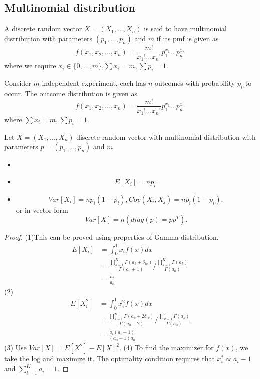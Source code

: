 \begin{refsection}
\subsection{Multinomial distribution}
\begin{definition}\cite[35]{murphy2012machine}
A discrete random vector $X=(X_1,...,X_n)$ is said to have multinomial distribution with parameters $(p_1,...,p_n)$ and $m$ if its pmf is given as
$$f(x_1,x_2,...,x_n)=\frac{m!}{x_1!...x_n!}p_1^{x_1}...p_n^{x_n}$$
where we require $x_i\in \{0,...,m\}$,$\sum x_i = m,\sum p_i=1$.
\end{definition}

\begin{remark}
	Consider $m$ independent experiment, each has $n$ outcomes with probability $p_i$ to occur. The outcome distribution is given as\cite{casella2002statistical}
	$$
	f(x_1,x_2,...,x_n)=\frac{m!}{x_1!...x_n!}p_1^{x_1}...p_n^{x_n}
	$$
	where $\sum x_i = m,\sum p_i=1$.
\end{remark}



\begin{lemma}\label{ch:theory-of-statistics:th:propertyMultinomialDistribution}
Let $X=(X_1,...,X_n)$ discrete random vector with multinomial distribution with parameters $p=(p_1,...,p_n)$ and $m$.
	\begin{itemize}
		\item 
		\item $$E[X_i] = np_i.$$
		\item $$Var[X_i] = np_i(1-p_i), Cov(X_i,X_j) = np_i(1-p_i),$$
	or in vector form
	$$Var[X] = n(diag(p) = pp^T).$$	
	\end{itemize}
\end{lemma}
\begin{proof}
	(1)This can be proved using properties of Gamma distribution.
	\begin{align*}
	E[X_i] &= \int_0^1 x_if(x)dx \\
	&=  \frac{\prod_{k=1}^K \Gamma(a_k + \delta_{ik})}{\Gamma(a_0+1)}/\frac{\prod_{k=1}^K \Gamma(a_k)}{\Gamma(a_0)}\\
	&= \frac{a_i}{a_0}
	\end{align*}	
	(2) \begin{align*}
	E[X_i^2] &= \int_0^1 x^2_if(x)dx \\
	&=  \frac{\prod_{k=1}^K \Gamma(a_k + 2\delta_{ik})}{\Gamma(a_0+2)}/\frac{\prod_{k=1}^K \Gamma(a_k)}{\Gamma(a_0)}\\
	&= \frac{a_i(a_i+1)}{(a_0+1)a_0}  
	\end{align*}
	(3) Use $Var[X] = E[X^2] - E[X]^2.$
	(4) To find the maximizer for $f(x)$, we take the log and maximize it. The optimality condition requires that $x_i^*\propto a_i-1$ and $\sum_{i=1}^{K}a_i=1$.
\end{proof}


\end{refsection}
